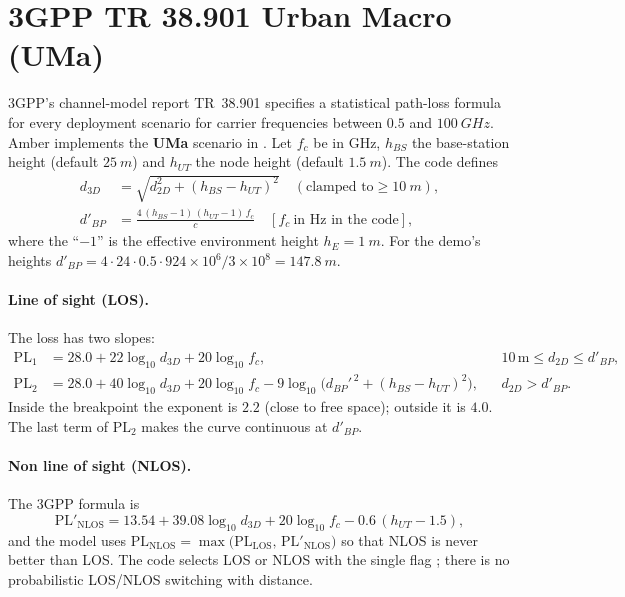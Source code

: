 \section{3GPP TR 38.901 Urban Macro (UMa)}
\label{sec:uma}

3GPP's channel-model report TR~38.901 \citep{3gpp38901} specifies a statistical
path-loss formula for every deployment scenario for carrier frequencies between
$0.5$ and $\SI{100}{GHz}$. Amber implements the \textbf{UMa} scenario in
. Let $f_c$ be in GHz, $h_{BS}$ the
base-station height (default $\SI{25}{m}$) and $h_{UT}$ the node height
(default $\SI{1.5}{m}$). The code defines
\begin{align}
 d_{3D}&=\sqrt{d_{2D}^2+(h_{BS}-h_{UT})^2}\quad(\text{clamped to}\ge\SI{10}{m}),\\
 d'_{BP}&=\frac{4\,(h_{BS}-1)\,(h_{UT}-1)\,f_c}{c}\quad[f_c\ \text{in Hz in the code}],
\end{align}
where the ``$-1$'' is the effective environment height $h_E=\SI{1}{m}$. For
the demo's heights $d'_{BP}=4\cdot24\cdot0.5\cdot924\times10^{6}/3\times10^{8}=\SI{147.8}{m}$.

\paragraph{Line of sight (LOS).} The loss has two slopes:
\begin{align}
 \mathrm{PL}_1 &= 28.0+22\log_{10}d_{3D}+20\log_{10}f_c, && 10\,\mathrm{m}\le d_{2D}\le d'_{BP},\label{eq:pl1}\\
 \mathrm{PL}_2 &= 28.0+40\log_{10}d_{3D}+20\log_{10}f_c-9\log_{10}\!\big(d_{BP}'^{\,2}+(h_{BS}-h_{UT})^2\big), && d_{2D}> d'_{BP}.\label{eq:pl2}
\end{align}
Inside the breakpoint the exponent is $2.2$ (close to free space); outside it is
$4.0$. The last term of $\mathrm{PL}_2$ makes the curve continuous at $d'_{BP}$.

\paragraph{Non line of sight (NLOS).} The 3GPP formula is
\begin{equation}
 \mathrm{PL}'_{\mathrm{NLOS}}=13.54+39.08\log_{10}d_{3D}+20\log_{10}f_c-0.6\,(h_{UT}-1.5),
\end{equation}
and the model uses $\mathrm{PL}_{\mathrm{NLOS}}=\max\!\big(\mathrm{PL}_{\mathrm{LOS}},\,\mathrm{PL}'_{\mathrm{NLOS}}\big)$ so that NLOS is never better than LOS. The
code selects LOS or NLOS with the single flag ; there is no
probabilistic LOS/NLOS switching with distance.

